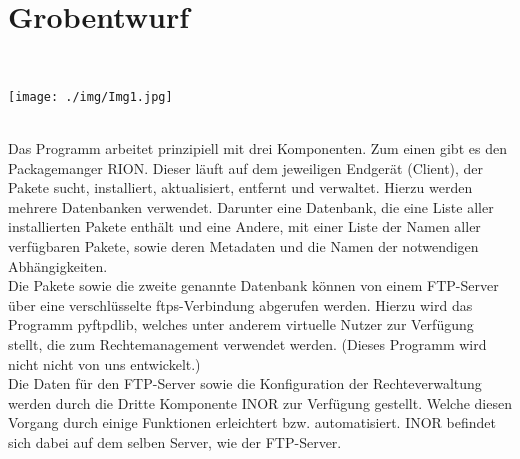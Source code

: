 \chapter{Grobentwurf}
\\[\intextsep]
\begin{minipage}{\linewidth}
\centering%
\texttt{[image: ./img/Img1.jpg]}%
\label{fig:Image 1}%
\end{minipage}
\\[\intextsep]

Das Programm arbeitet prinzipiell mit drei Komponenten. Zum einen gibt es den
Packagemanger RION. Dieser läuft auf dem jeweiligen Endgerät (Client), der Pakete sucht,
installiert, aktualisiert, entfernt und verwaltet. Hierzu werden mehrere Datenbanken
verwendet. Darunter eine Datenbank, die eine Liste aller installierten Pakete enthält und eine
Andere, mit einer Liste der Namen aller verfügbaren Pakete, sowie deren Metadaten und die
Namen der notwendigen Abhängigkeiten. \\


Die Pakete sowie die zweite genannte Datenbank können von einem FTP-Server über eine
verschlüsselte ftps-Verbindung abgerufen werden. Hierzu wird das Programm pyftpdlib,
welches unter anderem virtuelle Nutzer zur Verfügung stellt, die zum Rechtemanagement
verwendet werden. (Dieses Programm wird nicht nicht von uns entwickelt.)
\\

Die Daten für den FTP-Server sowie die Konfiguration der Rechteverwaltung werden durch
die Dritte Komponente INOR zur Verfügung gestellt. Welche diesen Vorgang durch einige
Funktionen erleichtert bzw. automatisiert. INOR befindet sich dabei auf dem selben Server,
wie der FTP-Server.\\   